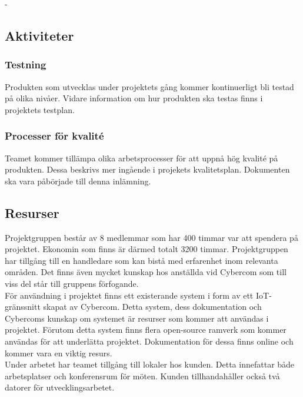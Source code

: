 -\subsection{Aktiviteter}

\subsubsection*{Testning}
Produkten som utvecklas under projektets gång kommer kontinuerligt bli testad på olika nivåer. Vidare information om hur produkten ska testas finns i projektets testplan\cite{bib-testplan}.

\subsubsection*{Processer för kvalité}
Teamet kommer tillämpa olika arbetsprocesser för att uppnå hög kvalité på produkten. Dessa beskrivs mer ingående i projekets kvalitetsplan\cite{bib-kvalitetsplan}.
Dokumenten ska vara påbörjade till denna inlämning.

\subsection{Resurser}
Projektgruppen består av 8 medlemmar som har 400 timmar var att spendera på projektet. Ekonomin som finns är därmed totalt 3200 timmar. Projektgruppen har tillgång till en handledare som kan bistå med erfarenhet inom relevanta områden. Det finns även mycket kunskap hos anställda vid Cybercom som till viss del står till gruppens förfogande.\\

För användning i projektet finns ett existerande system i form av ett IoT-gränssnitt skapat av Cybercom. Detta system,
dess dokumentation och Cybercoms kunskap om systemet är resurser som kommer att användas i projektet. Förutom detta
system finns flera open-source ramverk som kommer användas för att underlätta projektet. Dokumentation för dessa finns online och kommer vara en viktig resurs.\\

Under arbetet har teamet tillgång till lokaler hos kunden. Detta innefattar både arbetsplatser och konferensrum för möten. Kunden tillhandahåller också två datorer för utvecklingsarbetet. \\

\pagebreak
